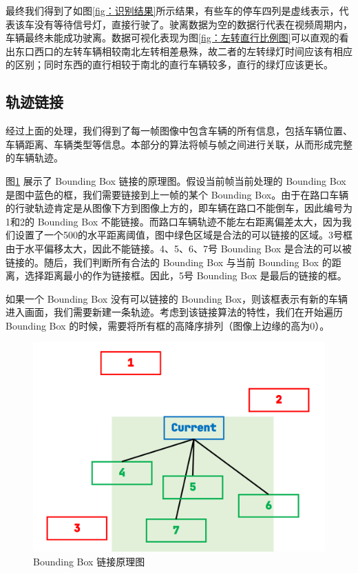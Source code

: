 最终我们得到了如图\ref{fig：识别结果}所示结果，有些车的停车四列是虚线表示，代表该车没有等待信号灯，直接行驶了。驶离数据为空的数据行代表在视频周期内，车辆最终未能成功驶离。数据可视化表现为图\ref{fig：左转直行比例图}可以直观的看出东口西口的左转车辆相较南北左转相差悬殊，故二者的左转绿灯时间应该有相应的区别；同时东西的直行相较于南北的直行车辆较多，直行的绿灯应该更长。

\subsection{轨迹链接}
经过上面的处理，我们得到了每一帧图像中包含车辆的所有信息，包括车辆位置、车辆距离、车辆类型等信息。本部分的算法将帧与帧之间进行关联，从而形成完整的车辆轨迹。

图\ref{fig:link} 展示了 Bounding Box 链接的原理图。假设当前帧当前处理的 Bounding Box 是图中蓝色的框，我们需要链接到上一帧的某个 Bounding Box。由于在路口车辆的行驶轨迹肯定是从图像下方到图像上方的，即车辆在路口不能倒车，因此编号为1和2的 Bounding Box 不能链接。而路口车辆轨迹不能左右距离偏差太大，因为我们设置了一个500的水平距离阈值，图中绿色区域是合法的可以链接的区域。3号框由于水平偏移太大，因此不能链接。4、5、6、7号 Bounding Box 是合法的可以被链接的。随后，我们判断所有合法的 Bounding Box 与当前 Bounding Box 的距离，选择距离最小的作为链接框。因此，5号 Bounding Box 是最后的链接的框。

如果一个 Bounding Box 没有可以链接的 Bounding Box，则该框表示有新的车辆进入画面，我们需要新建一条轨迹。考虑到该链接算法的特性，我们在开始遍历 Bounding Box 的时候，需要将所有框的高降序排列（图像上边缘的高为0）。

\begin{figure}[h]
    \centering
    \includegraphics[scale=0.5]{figures/link}
    \caption{Bounding Box 链接原理图}
    \label{fig:link}
\end{figure}

